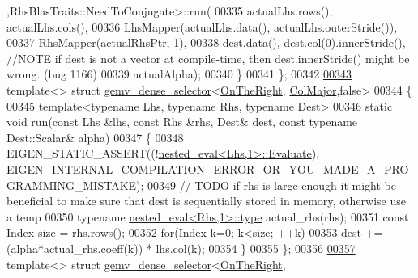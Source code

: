 \begin{DoxyCode}
      ,RhsBlasTraits::NeedToConjugate>::run(
00335         actualLhs.rows(), actualLhs.cols(),
00336         LhsMapper(actualLhs.data(), actualLhs.outerStride()),
00337         RhsMapper(actualRhsPtr, 1),
00338         dest.data(), dest.col(0).innerStride(), \textcolor{comment}{//NOTE  if dest is not a vector at compile-time, then
       dest.innerStride() might be wrong. (bug 1166)}
00339         actualAlpha);
00340   \}
00341 \};
00342 
\hyperlink{struct_eigen_1_1internal_1_1gemv__dense__selector_3_01_on_the_right_00_01_col_major_00_01false_01_4}{00343} \textcolor{keyword}{template}<> \textcolor{keyword}{struct }\hyperlink{struct_eigen_1_1internal_1_1gemv__dense__selector}{gemv\_dense\_selector}<\hyperlink{group__enums_ggac22de43beeac7a78b384f99bed5cee0ba99dc75d8e00b6c3a5bdc31940f47492b}{OnTheRight},
      \hyperlink{group__enums_ggaacded1a18ae58b0f554751f6cdf9eb13a0cbd4bdd0abcfc0224c5fcb5e4f6669a}{ColMajor},false>
00344 \{
00345   \textcolor{keyword}{template}<\textcolor{keyword}{typename} Lhs, \textcolor{keyword}{typename} Rhs, \textcolor{keyword}{typename} Dest>
00346   \textcolor{keyword}{static} \textcolor{keywordtype}{void} run(\textcolor{keyword}{const} Lhs &lhs, \textcolor{keyword}{const} Rhs &rhs, Dest& dest, \textcolor{keyword}{const} \textcolor{keyword}{typename} Dest::Scalar& alpha)
00347   \{
00348     EIGEN\_STATIC\_ASSERT((!\hyperlink{struct_eigen_1_1internal_1_1nested__eval}{nested\_eval<Lhs,1>::Evaluate}),
      EIGEN\_INTERNAL\_COMPILATION\_ERROR\_OR\_YOU\_MADE\_A\_PROGRAMMING\_MISTAKE);
00349     \textcolor{comment}{// TODO if rhs is large enough it might be beneficial to make sure that dest is sequentially stored in
       memory, otherwise use a temp}
00350     \textcolor{keyword}{typename} \hyperlink{class_eigen_1_1internal_1_1_tensor_lazy_evaluator_writable}{nested\_eval<Rhs,1>::type} actual\_rhs(rhs);
00351     \textcolor{keyword}{const} \hyperlink{namespace_eigen_a62e77e0933482dafde8fe197d9a2cfde}{Index} size = rhs.rows();
00352     \textcolor{keywordflow}{for}(\hyperlink{namespace_eigen_a62e77e0933482dafde8fe197d9a2cfde}{Index} k=0; k<size; ++k)
00353       dest += (alpha*actual\_rhs.coeff(k)) * lhs.col(k);
00354   \}
00355 \};
00356 
\hyperlink{struct_eigen_1_1internal_1_1gemv__dense__selector_3_01_on_the_right_00_01_row_major_00_01false_01_4}{00357} \textcolor{keyword}{template}<> \textcolor{keyword}{struct }\hyperlink{struct_eigen_1_1internal_1_1gemv__dense__selector}{gemv\_dense\_selector}<\hyperlink{group__enums_ggac22de43beeac7a78b384f99bed5cee0ba99dc75d8e00b6c3a5bdc31940f47492b}{OnTheRight},

\end{DoxyCode}
